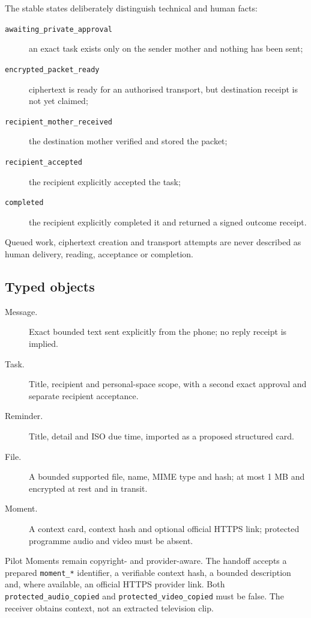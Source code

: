 The stable states deliberately distinguish technical and human facts:
\begin{description}
  \item[\texttt{awaiting\_private\_approval}] an exact task exists only on the sender
        mother and nothing has been sent;
  \item[\texttt{encrypted\_packet\_ready}] ciphertext is ready for an authorised
        transport, but destination receipt is not yet claimed;
  \item[\texttt{recipient\_mother\_received}] the destination mother verified and
        stored the packet;
  \item[\texttt{recipient\_accepted}] the recipient explicitly accepted the task;
  \item[\texttt{completed}] the recipient explicitly completed it and returned a
        signed outcome receipt.
\end{description}
Queued work, ciphertext creation and transport attempts are never described as human
delivery, reading, acceptance or completion.

\subsection{Typed objects}

\begin{description}
  \item[Message.] Exact bounded text sent explicitly from the phone; no reply
        receipt is implied.
  \item[Task.] Title, recipient and personal-space scope, with a second exact
        approval and separate recipient acceptance.
  \item[Reminder.] Title, detail and ISO due time, imported as a proposed
        structured card.
  \item[File.] A bounded supported file, name, MIME type and hash; at most 1 MB
        and encrypted at rest and in transit.
  \item[Moment.] A context card, context hash and optional official HTTPS link;
        protected programme audio and video must be absent.
\end{description}

Pilot Moments remain copyright- and provider-aware.  The handoff accepts a prepared
\texttt{moment\_*} identifier, a verifiable context hash, a bounded description and,
where available, an official HTTPS provider link.  Both
\texttt{protected\_audio\_copied} and \texttt{protected\_video\_copied} must be false.
The receiver obtains context, not an extracted television clip.

